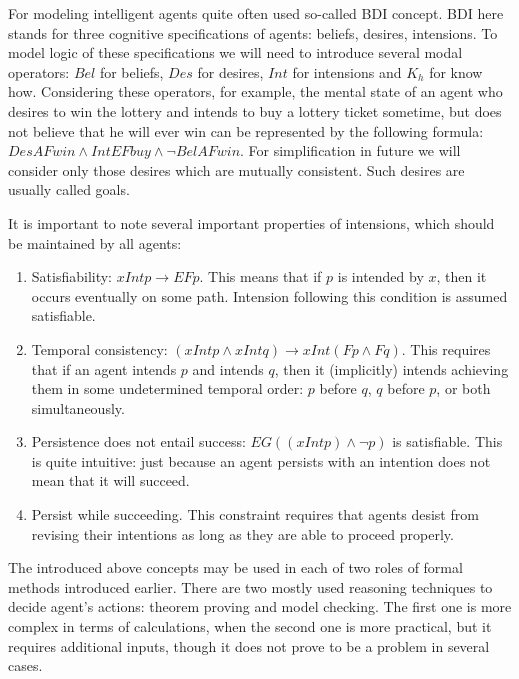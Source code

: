 For modeling intelligent agents quite often used so-called BDI concept. BDI here stands for three cognitive specifications of agents: beliefs, desires, intensions. To model logic of these specifications we will need to introduce several modal operators: $Bel$ for beliefs, $Des$ for desires, $Int$ for intensions and $K_h$ for know how. Considering these operators, for example, the mental state of an agent who desires to win the lottery and intends to buy a lottery ticket sometime, but does not believe that he will ever win can be represented by the following formula: $DesAFwin \land IntEFbuy \land \neg BelAFwin$. For simplification in future we will consider only those desires which are mutually consistent. Such desires are usually called goals.

It is important to note several important properties of intensions, which should be maintained by all agents\cite{Singh_92}:
\begin{enumerate}
  \item Satisfiability: $xIntp\rightarrow EFp$. This means that if $p$ is intended by $x$, then it occurs eventually on some path. Intension following this condition is assumed satisfiable.
  \item Temporal consistency: $(xIntp \land xIntq)\rightarrow xInt(Fp \land Fq)$. This requires that if an agent intends $p$ and intends $q$, then it  (implicitly) intends achieving them in some undetermined temporal order: $p$ before $q$, $q$ before $p$, or both simultaneously.
  \item Persistence does not entail success: $EG((xIntp) \land \neg p)$ is satisfiable. This is quite intuitive: just because an agent persists with an intention does not mean that it will succeed.
  \item Persist while succeeding. This constraint requires that agents desist from revising their intentions as long as they are able to proceed properly.
\end{enumerate}

The introduced above concepts may be used in each of two roles of formal methods introduced earlier. There are two mostly used reasoning techniques to decide agent's actions: theorem proving and model checking. The first one is more complex in terms of calculations, when the second one is more practical, but it requires additional inputs, though it does not prove to be a problem in several cases.


